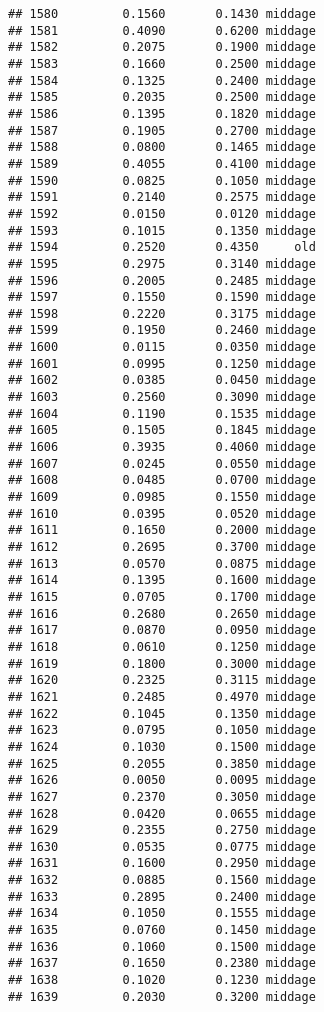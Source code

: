 \documentclass[
]{article}
\begin{document}
\begin{verbatim}
## 1580         0.1560       0.1430 middage
## 1581         0.4090       0.6200 middage
## 1582         0.2075       0.1900 middage
## 1583         0.1660       0.2500 middage
## 1584         0.1325       0.2400 middage
## 1585         0.2035       0.2500 middage
## 1586         0.1395       0.1820 middage
## 1587         0.1905       0.2700 middage
## 1588         0.0800       0.1465 middage
## 1589         0.4055       0.4100 middage
## 1590         0.0825       0.1050 middage
## 1591         0.2140       0.2575 middage
## 1592         0.0150       0.0120 middage
## 1593         0.1015       0.1350 middage
## 1594         0.2520       0.4350     old
## 1595         0.2975       0.3140 middage
## 1596         0.2005       0.2485 middage
## 1597         0.1550       0.1590 middage
## 1598         0.2220       0.3175 middage
## 1599         0.1950       0.2460 middage
## 1600         0.0115       0.0350 middage
## 1601         0.0995       0.1250 middage
## 1602         0.0385       0.0450 middage
## 1603         0.2560       0.3090 middage
## 1604         0.1190       0.1535 middage
## 1605         0.1505       0.1845 middage
## 1606         0.3935       0.4060 middage
## 1607         0.0245       0.0550 middage
## 1608         0.0485       0.0700 middage
## 1609         0.0985       0.1550 middage
## 1610         0.0395       0.0520 middage
## 1611         0.1650       0.2000 middage
## 1612         0.2695       0.3700 middage
## 1613         0.0570       0.0875 middage
## 1614         0.1395       0.1600 middage
## 1615         0.0705       0.1700 middage
## 1616         0.2680       0.2650 middage
## 1617         0.0870       0.0950 middage
## 1618         0.0610       0.1250 middage
## 1619         0.1800       0.3000 middage
## 1620         0.2325       0.3115 middage
## 1621         0.2485       0.4970 middage
## 1622         0.1045       0.1350 middage
## 1623         0.0795       0.1050 middage
## 1624         0.1030       0.1500 middage
## 1625         0.2055       0.3850 middage
## 1626         0.0050       0.0095 middage
## 1627         0.2370       0.3050 middage
## 1628         0.0420       0.0655 middage
## 1629         0.2355       0.2750 middage
## 1630         0.0535       0.0775 middage
## 1631         0.1600       0.2950 middage
## 1632         0.0885       0.1560 middage
## 1633         0.2895       0.2400 middage
## 1634         0.1050       0.1555 middage
## 1635         0.0760       0.1450 middage
## 1636         0.1060       0.1500 middage
## 1637         0.1650       0.2380 middage
## 1638         0.1020       0.1230 middage
## 1639         0.2030       0.3200 middage

\end{verbatim}
\end{document}
